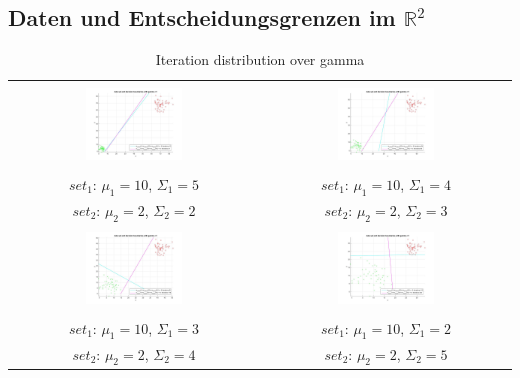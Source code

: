 \documentclass[]{report}
\begin{document}
\subsection{Daten und Entscheidungsgrenzen im $\mathbb{R}^2$}


\begin{table}[h]
\begin{tabular}{| c | c |}
\hline
 & \\
\includegraphics[width=0.4\textwidth]{./images/DataSetAndDecisionBoundary_110.jpg} & \includegraphics[width=0.4\textwidth]{./images/DataSetAndDecisionBoundary_210.jpg} \\
 & \\
 $set_{1}$: $\mu_1=10$, $\Sigma_1=5$ & $set_{1}$: $\mu_1=10$, $\Sigma_1=4$ \\
 $set_{2}$: $\mu_2=2$, $\Sigma_2=2$ & $set_{2}$: $\mu_2=2$, $\Sigma_2=3$ \\
\hline
 & \\
\includegraphics[width=0.4\textwidth]{./images/DataSetAndDecisionBoundary_310.jpg} & \includegraphics[width=0.4\textwidth]{./images/DataSetAndDecisionBoundary_410.jpg} \\
 & \\
$set_1$: $\mu_1=10$, $\Sigma_1=3$ & $set_1$: $\mu_1=10$, $\Sigma_1=2$ \\
$set_2$: $\mu_2=2$, $\Sigma_2=4$ & $set_2$: $\mu_2=2$, $\Sigma_2=5$ \\
\hline
\end{tabular}
\caption{Iteration distribution over gamma}
\label{tab:DataSetsAndBounds}
\end{table}
\end{document}
